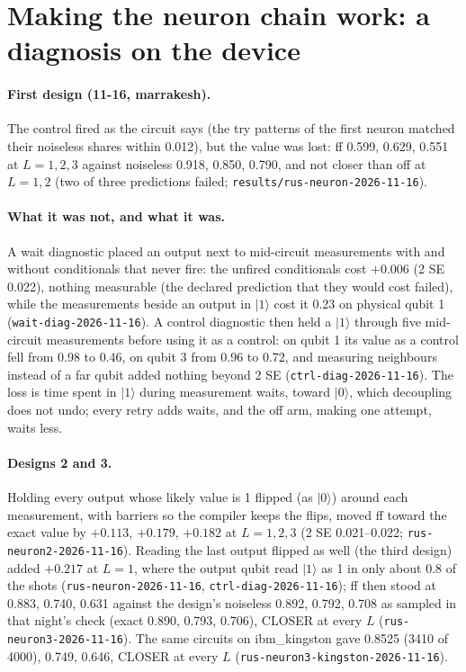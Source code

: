 \documentclass[10pt,a4paper]{article}
\begin{document}
\section{Making the neuron chain work: a diagnosis on the device}\label{sec:diagnosis}
\paragraph{First design (11-16, marrakesh).} The control fired as the circuit says (the try patterns of the first
neuron matched their noiseless shares within 0.012), but the value was lost: ff 0.599, 0.629, 0.551 at $L = 1, 2, 3$
against noiseless 0.918, 0.850, 0.790, and not closer than off at $L = 1, 2$ (two of three predictions failed;
\texttt{results/rus-neuron-2026-11-16}).

\paragraph{What it was not, and what it was.} A wait diagnostic placed an output next to mid-circuit measurements with
and without conditionals that never fire: the unfired conditionals cost $+0.006$ (2 SE 0.022), nothing measurable (the
declared prediction that they would cost failed), while the measurements beside an output in $|1\rangle$ cost it 0.23 on
physical qubit 1 (\texttt{wait-diag-2026-11-16}). A control diagnostic then held a $|1\rangle$ through five
mid-circuit measurements before using it as a control: on qubit 1 its value as a control fell from 0.98 to 0.46, on
qubit 3 from 0.96 to 0.72, and measuring neighbours instead of a far qubit added nothing beyond 2 SE
(\texttt{ctrl-diag-2026-11-16}). The loss is time spent in $|1\rangle$ during measurement waits, toward $|0\rangle$,
which decoupling does not undo; every retry adds waits, and the off arm, making one attempt, waits less.

\paragraph{Designs 2 and 3.} Holding every output whose likely value is 1 flipped (as $|0\rangle$) around each
measurement, with barriers so the compiler keeps the flips, moved ff toward the exact value by $+0.113$, $+0.179$,
$+0.182$ at $L = 1, 2, 3$ (2 SE 0.021--0.022; \texttt{rus-neuron2-2026-11-16}). Reading the last output flipped as
well (the third design) added $+0.217$ at $L = 1$, where the output qubit read $|1\rangle$ as 1 in only about 0.8 of the
shots (\texttt{rus-neuron-2026-11-16}, \texttt{ctrl-diag-2026-11-16}); ff then stood at 0.883, 0.740, 0.631 against the design's noiseless 0.892, 0.792, 0.708 as sampled in that night's check (exact 0.890, 0.793,
0.706), CLOSER at every $L$
(\texttt{rus-neuron3-2026-11-16}). The same circuits on ibm\_kingston gave 0.8525 (3410 of 4000), 0.749, 0.646, CLOSER at every $L$
(\texttt{rus-neuron3-kingston-2026-11-16}).
\end{document}
